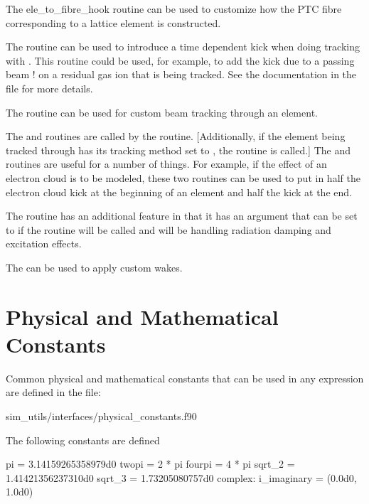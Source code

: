 {{{{{{The {ele_to_fibre_hook} routine can be used to customize how the PTC fibre corresponding to a
\bmad lattice element is constructed. 

The  routine can be used to introduce a time
dependent kick when doing tracking with . This routine could be used,
for example, to add the kick due to a passing beam ! on a residual gas ion that is being
tracked. See the documentation in the file 
for more details.

The  routine can be used for custom beam tracking through an element.

The  and  routines are called by the
 routine. [Additionally, if the element being tracked through has its
tracking method set to , the  routine is called.] The
 and  routines are useful for a number of things. For
example, if the effect of an electron cloud is to be modeled, these two routines can be used to put
in half the electron cloud kick at the beginning of an element and half the kick at the end.

The routine  has an additional feature in that
it has an argument  that can be set to 
if the routine  will be called and  will
be handling radiation damping and excitation effects.

The  can be used to apply custom wakes.

\section{Physical and Mathematical Constants}
\label{s:physical.constants}

Common physical and mathematical constants that can be used in any expression
are defined in the file:
\begin{example}
 sim_utils/interfaces/physical_constants.f90
\end{example}

The following constants are defined
\begin{example}
  pi = 3.14159265358979d0
  twopi = 2 * pi
  fourpi = 4 * pi
  sqrt_2 = 1.41421356237310d0
  sqrt_3 = 1.73205080757d0
  complex: i_imaginary = (0.0d0, 1.0d0)


\end{example}}}}}}}
